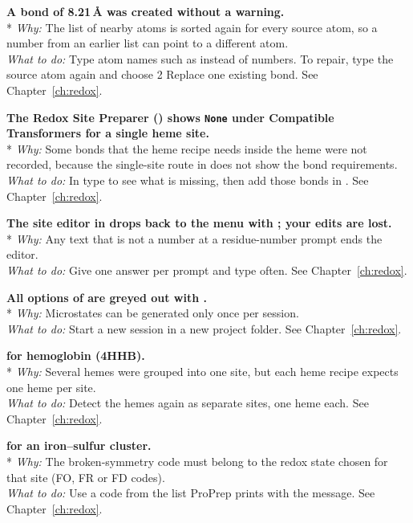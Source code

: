 {\bfseries A bond of 8.21\,Å was created without a warning.}\\*
\emph{Why:} The list of nearby atoms is sorted again for every source atom, so
a number from an earlier list can point to a different atom.\\
\emph{What to do:} Type atom names such as  instead of numbers. To
repair, type the source atom again and choose \textsf{2 Replace one existing
bond}. See Chapter~\ref{ch:redox}.

{\bfseries The Redox Site Preparer () shows \texttt{None} under
\textsf{Compatible Transformers} for a single heme site.}\\*
\emph{Why:} Some bonds that the heme recipe needs inside the heme were not
recorded, because the single-site route in  does not show the bond
requirements.\\
\emph{What to do:} In  type  to see what is missing, then
add those bonds in . See Chapter~\ref{ch:redox}.

{\bfseries The site editor in  drops back to the menu with
; your edits are lost.}\\*
\emph{Why:} Any text that is not a number at a residue-number prompt ends the
editor.\\
\emph{What to do:} Give one answer per prompt and type  often. See
Chapter~\ref{ch:redox}.

{\bfseries All options of  are greyed out with .}\\*
\emph{Why:} Microstates can be generated only once per session.\\
\emph{What to do:} Start a new session in a new project folder. See
Chapter~\ref{ch:redox}.

{\bfseries {} for
hemoglobin (4HHB).}\\*
\emph{Why:} Several hemes were grouped into one site, but each heme recipe
expects one heme per site.\\
\emph{What to do:} Detect the hemes again as separate sites, one heme each.
See Chapter~\ref{ch:redox}.

{\bfseries {} for an
iron--sulfur cluster.}\\*
\emph{Why:} The broken-symmetry code must belong to the redox state chosen
for that site (FO, FR or FD codes).\\
\emph{What to do:} Use a code from the list ProPrep prints with the message.
See Chapter~\ref{ch:redox}.

